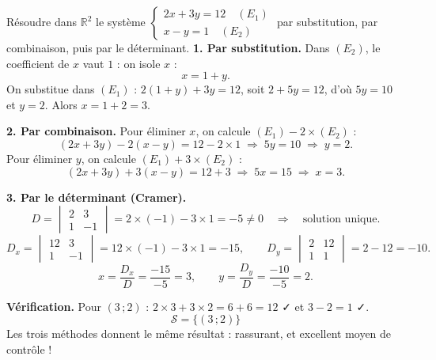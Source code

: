 \documentclass[11pt]{article}
\begin{document}
\begin{exoresolu}[Résolution du système $\begin{cases} 2x + 3y = 12 \\ x - y = 1 \end{cases}$ par les trois méthodes]
Résoudre dans $\mathbb{R}^2$ le système $\begin{cases} 2x + 3y = 12 \quad (E_1)\\ x - y = 1 \quad (E_2) \end{cases}$ par substitution, par combinaison, puis par le déterminant.
\tcblower
\textbf{1. Par substitution.} Dans $(E_2)$, le coefficient de $x$ vaut $1$ : on isole $x$ :
\[ x = 1 + y. \]
On substitue dans $(E_1)$ : $2(1 + y) + 3y = 12$, soit $2 + 5y = 12$, d'où $5y = 10$ et $y = 2$. Alors $x = 1 + 2 = 3$.

\textbf{2. Par combinaison.} Pour éliminer $x$, on calcule $(E_1) - 2\times(E_2)$ :
\[ (2x + 3y) - 2(x - y) = 12 - 2 \times 1 \;\Longrightarrow\; 5y = 10 \;\Longrightarrow\; y = 2. \]
Pour éliminer $y$, on calcule $(E_1) + 3\times(E_2)$ :
\[ (2x + 3y) + 3(x - y) = 12 + 3 \;\Longrightarrow\; 5x = 15 \;\Longrightarrow\; x = 3. \]

\textbf{3. Par le déterminant (Cramer).}
\[ D = \begin{vmatrix} 2 & 3 \\ 1 & -1 \end{vmatrix} = 2\times(-1) - 3\times 1 = -5 \neq 0 \quad \Rightarrow \quad \text{solution unique.} \]
\[ D_x = \begin{vmatrix} 12 & 3 \\ 1 & -1 \end{vmatrix} = 12\times(-1) - 3\times 1 = -15, \qquad D_y = \begin{vmatrix} 2 & 12 \\ 1 & 1 \end{vmatrix} = 2 - 12 = -10. \]
\[ x = \frac{D_x}{D} = \frac{-15}{-5} = 3, \qquad y = \frac{D_y}{D} = \frac{-10}{-5} = 2. \]

\textbf{Vérification.} Pour $(3\,;2)$ : $2\times 3 + 3\times 2 = 6 + 6 = 12$ ✓ et $3 - 2 = 1$ ✓.
\[ \boxed{\mathcal{S} = \{(3\,;2)\}} \]
Les trois méthodes donnent le même résultat : rassurant, et excellent moyen de contrôle !
\end{exoresolu}
\end{document}
